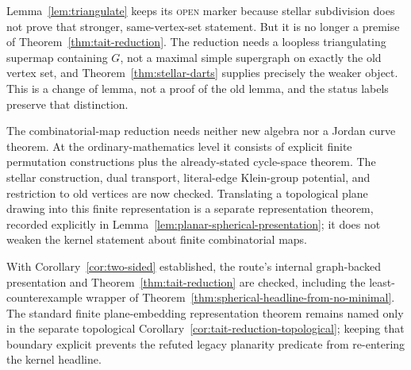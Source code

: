 \begin{remark}
\Sprose
Lemma~\ref{lem:triangulate} keeps its \textsc{open} marker because stellar
subdivision does not prove that stronger, same-vertex-set statement.  But it
is no longer a premise of Theorem~\ref{thm:tait-reduction}.  The reduction
needs a loopless triangulating supermap containing $G$, not a maximal simple
supergraph on exactly the old vertex set, and
Theorem~\ref{thm:stellar-darts} supplies precisely the weaker object.  This is
a change of lemma, not a proof of the old lemma, and the status labels preserve
that distinction.
\end{remark}

\begin{remark}
\Sprose
The combinatorial-map reduction needs neither new algebra nor a Jordan curve theorem.  At the
ordinary-mathematics level it consists of explicit finite permutation
constructions plus the already-stated cycle-space theorem.  The stellar
construction, dual transport, literal-edge Klein-group potential, and
restriction to old vertices are now checked.  Translating a topological plane
drawing into this finite representation is a separate representation theorem,
recorded explicitly in Lemma~\ref{lem:planar-spherical-presentation}; it does
not weaken the kernel statement about finite combinatorial maps.
\end{remark}

\begin{remark}
With Corollary~\ref{cor:two-sided} established, the route's internal
graph-backed presentation and Theorem~\ref{thm:tait-reduction} are checked,
including the least-counterexample wrapper of
Theorem~\ref{thm:spherical-headline-from-no-minimal}.  The standard finite
plane-embedding representation theorem remains named only in the separate
topological Corollary~\ref{cor:tait-reduction-topological}; keeping that
boundary explicit prevents the refuted legacy planarity predicate from
re-entering the kernel headline.
\end{remark}
